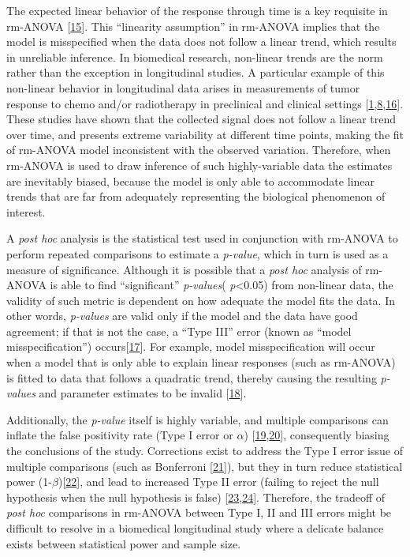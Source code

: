 \documentclass[
]{article}
\begin{document}
The expected linear behavior of the response through time is a key requisite in rm-ANOVA {[}\protect\hyperlink{ref-pinheiro2006}{15}{]}. This ``linearity assumption'' in rm-ANOVA implies that the model is misspecified when the data does not follow a linear trend, which results in unreliable inference. In biomedical research, non-linear trends are the norm rather than the exception in longitudinal studies. A particular example of this non-linear behavior in longitudinal data arises in measurements of tumor response to chemo and/or radiotherapy in preclinical and clinical settings {[}\protect\hyperlink{ref-roblyer2011}{1},\protect\hyperlink{ref-skala2010}{8},\protect\hyperlink{ref-vishwanath2009}{16}{]}. These studies have shown that the collected signal does not follow a linear trend over time, and presents extreme variability at different time points, making the fit of rm-ANOVA model inconsistent with the observed variation. Therefore, when rm-ANOVA is used to draw inference of such highly-variable data the estimates are inevitably biased, because the model is only able to accommodate linear trends that are far from adequately representing the biological phenomenon of interest.

A \emph{post hoc} analysis is the statistical test used in conjunction with rm-ANOVA to perform repeated comparisons to estimate a \emph{p-value}, which in turn is used as a measure of significance.
Although it is possible that a \emph{post hoc} analysis of rm-ANOVA is able to find ``significant'' \emph{p-values}( \emph{p}\textless{}0.05) from non-linear data, the validity of such metric is dependent on how adequate the model fits the data. In other words, \emph{p-values} are valid only if the model and the data have good agreement; if that is not the case, a ``Type III'' error (known as ``model misspecification'') occurs{[}\protect\hyperlink{ref-dennis2019}{17}{]}. For example, model misspecification will occur when a model that is only able to explain linear responses (such as rm-ANOVA) is fitted to data that follows a quadratic trend, thereby causing the resulting \emph{p-values} and parameter estimates to be invalid {[}\protect\hyperlink{ref-wang2019}{18}{]}.

Additionally, the \emph{p-value} itself is highly variable, and multiple comparisons can inflate the false positivity rate (Type I error or \(\alpha\)) {[}\protect\hyperlink{ref-liu2010}{19},\protect\hyperlink{ref-halsey2015}{20}{]}, consequently biasing the conclusions of the study. Corrections exist to address the Type I error issue of multiple comparisons (such as Bonferroni {[}\protect\hyperlink{ref-abdi2010}{21}{]}), but they in turn reduce statistical power (1-\(\beta\)){[}\protect\hyperlink{ref-nakagawa2004}{22}{]}, and lead to increased Type II error (failing to reject the null hypothesis when the null hypothesis is false) {[}\protect\hyperlink{ref-gelman2012}{23},\protect\hyperlink{ref-albers2019}{24}{]}. Therefore, the tradeoff of \emph{post hoc} comparisons in rm-ANOVA between Type I, II and III errors might be difficult to resolve in a biomedical longitudinal study where a delicate balance exists between statistical power and sample size.
\end{document}
